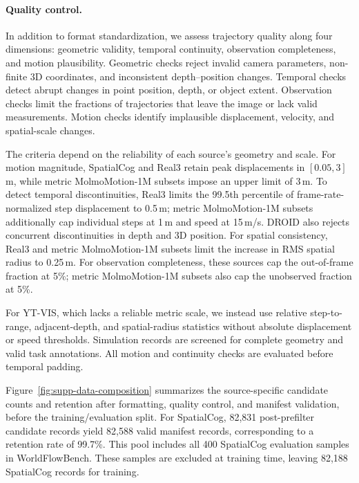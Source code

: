\paragraph{Quality control.}
In addition to format standardization, we assess trajectory
quality along four dimensions: geometric validity,
temporal continuity, observation completeness, and motion
plausibility.
Geometric checks reject invalid camera parameters,
non-finite 3D coordinates, and inconsistent depth--position
changes.
Temporal checks detect abrupt changes in point position,
depth, or object extent.
Observation checks limit the fractions of trajectories
that leave the image or lack valid measurements.
Motion checks identify implausible displacement, velocity,
and spatial-scale changes.

The criteria depend on the reliability of each source's
geometry and scale.
For motion magnitude, SpatialCog and Real3 retain peak
displacements in $[0.05,3]$\,m, while metric MolmoMotion-1M
subsets impose an upper limit of 3\,m.
To detect temporal discontinuities, Real3 limits the
99.5th percentile of frame-rate-normalized step displacement
to 0.5\,m; metric MolmoMotion-1M subsets additionally cap
individual steps at 1\,m and speed at 15\,m/s.
DROID also rejects concurrent discontinuities in depth
and 3D position.
For spatial consistency, Real3 and metric MolmoMotion-1M
subsets limit the increase in RMS spatial radius to 0.25\,m.
For observation completeness, these sources cap the
out-of-frame fraction at 5\%; metric MolmoMotion-1M subsets
also cap the unobserved fraction at 5\%.

For YT-VIS, which lacks a reliable metric scale, we instead
use relative step-to-range, adjacent-depth, and spatial-radius
statistics without absolute displacement or speed thresholds.
Simulation records are screened for complete geometry and
valid task annotations.
All motion and continuity checks are evaluated before
temporal padding.

Figure~\ref{fig:supp-data-composition} summarizes the
source-specific candidate counts and retention after
formatting, quality control, and manifest validation,
before the training/evaluation split.
For SpatialCog, 82,831 post-prefilter candidate records
yield 82,588 valid manifest records, corresponding to
a retention rate of 99.7\%.
This pool includes all 400 SpatialCog evaluation samples
in WorldFlowBench.
These samples are excluded at training time, leaving
82,188 SpatialCog records for training.

